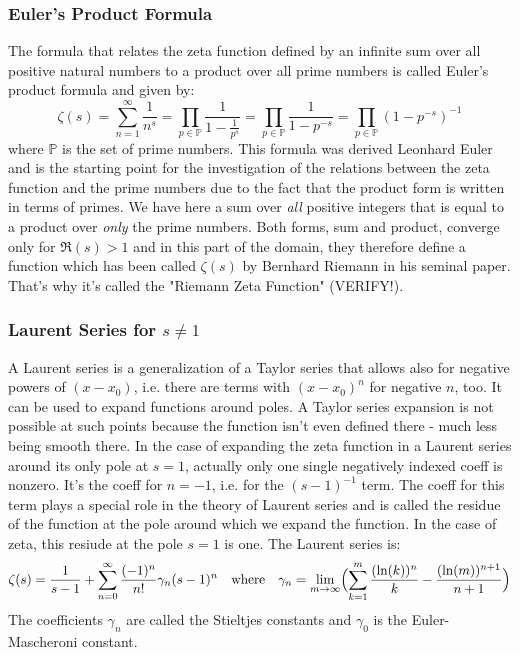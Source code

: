 \documentclass[12pt]{article}
\begin{document}
\subsubsection{Euler's Product Formula}
The formula that relates the zeta function defined by an infinite sum over all positive natural numbers to a product over all prime numbers is called Euler's product formula and given by:
\begin{equation}
\label{Eq:EulerProduct}		
\zeta(s)		
= \sum_{n=1}^{\infty} \frac{1}{n^s}
= \prod_{p \in \mathbb{P}} \frac{1}{1 - \frac{1}{p^s} }
= \prod_{p \in \mathbb{P}} \frac{1}{1 - p^{-s} }    
= \prod_{p \in \mathbb{P}} (1 - p^{-s})^{-1}
\end{equation}
where $\mathbb{P}$ is the set of prime numbers. This formula was derived Leonhard Euler and is the starting point for the investigation of the relations between the zeta function and the prime numbers due to the fact that the product form is written in terms of primes. We have here a sum over \emph{all} positive integers that is equal to a product over \emph{only} the prime numbers. Both forms, sum and product, converge only for $\Re(s) > 1$ and in this part of the domain, they therefore define a function which has been called $\zeta(s)$ by Bernhard Riemann in his seminal paper. That's why it's called the "Riemann Zeta Function" (VERIFY!).

\subsubsection{Laurent Series for $s \neq 1$}
A Laurent series is a generalization of a Taylor series that allows also for negative powers of $(x-x_0)$, i.e. there are terms with $(x-x_0)^n$ for negative $n$, too. It can be used to expand functions around poles. A Taylor series expansion is not possible at such points because the function isn't even defined there - much less being smooth there. In the case of expanding the zeta function in a Laurent series around its only pole at $s=1$, actually only one single negatively indexed coeff is nonzero. It's the coeff for $n=-1$, i.e. for the $(s-1)^{-1}$ term. The coeff for this term plays a special role in the theory of Laurent series and is called the residue of the function at the pole around which we expand the function. In the case of zeta, this resiude at the pole $s=1$ is one. The Laurent series is:
\begin{equation}
\label{Eq:LaurentSeries}	
\zeta(s) = \frac{1}{s-1} + \sum_{n=0}^{\infty} \frac{(-1)^n}{n!} \gamma_n (s-1)^n
\quad \text{where} \quad
\gamma_n = \lim_{m \rightarrow \infty}
\Bigl( \sum_{k=1}^{m} \frac{(\ln(k))^n}{k} - \frac{(\ln(m))^{n+1}}{n+1}  \Bigr)
\end{equation}
The coefficients $\gamma_n$ are called the Stieltjes constants and $\gamma_0$ is the Euler-Mascheroni constant. 
\end{document}
